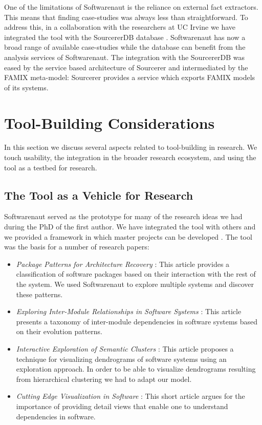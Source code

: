 \documentclass[preprint,12pt]{elsarticle}
\begin{document}
One of the limitations of Softwarenaut is the reliance on external fact extractors. This means that finding case-studies was always less than straightforward. To address this, in a collaboration with the researchers at UC Irvine we have integrated the tool with the SourcererDB database \cite{linstead-sourcerer}. Softwarenaut has now a broad range of available case-studies while the database can benefit from the analysis services of Softwarenaut. The integration with the SourcererDB was eased by the service based architecture of Sourcerer and intermediated by the FAMIX meta-model: Sourcerer provides a service which exports FAMIX models of its systems. 


\section {Tool-Building Considerations} \label {sec:disc}

In this section we discuss several aspects related to tool-building in research. We touch usability, the integration in the broader research ecosystem, and using the tool as a testbed for research.


\subsection {The Tool as a Vehicle for Research}
Softwarenaut served as the prototype for many of the research ideas we had during the PhD of the first author. We have integrated the tool with others \cite{lungu-clust, lungu-scico, nier-story} and we provided a framework in which master projects can be developed \cite{boeckmann-mars}. %
The tool was the basis for a number of research papers: 
\begin{itemize}
\item {\em Package Patterns for Architecture Recovery} \cite{lungu-packages}: This article provides a classification of software packages based on their interaction with the rest of the system. We used Softwarenaut to explore multiple systems and discover these patterns.
\item {\em Exploring Inter-Module Relationships in Software Systems} \cite{lungu-relevo}: This article presents a taxonomy of inter-module dependencies in software systems based on their evolution patterns.
\item {\em Interactive Exploration of Semantic Clusters} \cite{lungu-clust}: This article proposes a technique for visualizing dendrograms of software systems using an exploration approach. In order to be able to visualize {dendrograms} resulting from hierarchical clustering we had to adapt our model.
\item {\em Cutting Edge Visualization in Software} \cite{lungu-cutedge}: This short article argues for the importance of providing detail views that enable one to understand dependencies in software.
\end{itemize}
\end{document}
